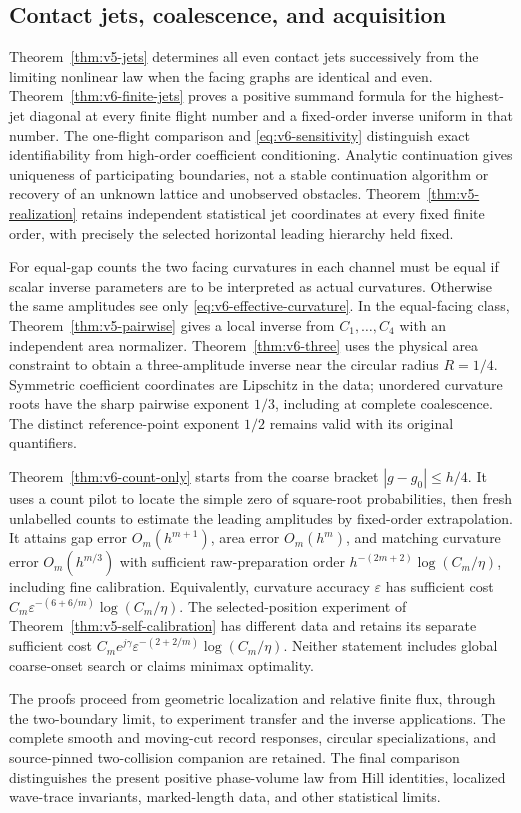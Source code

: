 \subsection{Contact jets, coalescence, and acquisition}
Theorem~\ref{thm:v5-jets} determines all even contact jets successively
from the limiting nonlinear law when the facing graphs are identical and
even. Theorem~\ref{thm:v6-finite-jets} proves a positive summand formula
for the highest-jet diagonal at every finite flight number and a
fixed-order inverse uniform in that number. The one-flight comparison
and \eqref{eq:v6-sensitivity} distinguish exact identifiability from
high-order coefficient conditioning. Analytic continuation gives
uniqueness of participating boundaries, not a stable continuation
algorithm or recovery of an unknown lattice and unobserved obstacles.
Theorem~\ref{thm:v5-realization} retains independent statistical jet
coordinates at every fixed finite order, with precisely the selected
horizontal leading hierarchy held fixed.

For equal-gap counts the two facing curvatures in each channel must be
equal if scalar inverse parameters are to be interpreted as actual
curvatures. Otherwise the same amplitudes see only
\eqref{eq:v6-effective-curvature}. In the equal-facing class,
Theorem~\ref{thm:v5-pairwise} gives a local inverse from $C_1,\ldots,C_4$
with an independent area normalizer. Theorem~\ref{thm:v6-three} uses the
physical area constraint to obtain a three-amplitude inverse near the
circular radius $R=1/4$. Symmetric coefficient coordinates are Lipschitz
in the data; unordered curvature roots have the sharp pairwise exponent
$1/3$, including at complete coalescence. The distinct reference-point
exponent $1/2$ remains valid with its original quantifiers.

Theorem~\ref{thm:v6-count-only} starts from the coarse bracket
$|g-g_0|\le h/4$. It uses a count pilot to locate the simple zero of
square-root probabilities, then fresh unlabelled counts to estimate the
leading amplitudes by fixed-order extrapolation. It attains gap error
$O_m(h^{m+1})$, area error $O_m(h^m)$, and matching curvature error
$O_m(h^{m/3})$ with sufficient raw-preparation order
$h^{-(2m+2)}\log(C_m/\eta)$, including fine calibration. Equivalently,
curvature accuracy $\varepsilon$ has sufficient cost
$C_m\varepsilon^{-(6+6/m)}\log(C_m/\eta)$.
The selected-position experiment of Theorem~\ref{thm:v5-self-calibration}
has different data and retains its separate sufficient cost
$C_me^{j\gamma}\varepsilon^{-(2+2/m)}\log(C_m/\eta)$.
Neither statement includes global coarse-onset search or claims minimax
optimality.

The proofs proceed from geometric localization and relative finite
flux, through the two-boundary limit, to experiment transfer and the
inverse applications. The complete smooth and moving-cut record
responses, circular specializations, and source-pinned two-collision
companion are retained. The final comparison distinguishes the present
positive phase-volume law from Hill identities, localized wave-trace
invariants, marked-length data, and other statistical limits.
